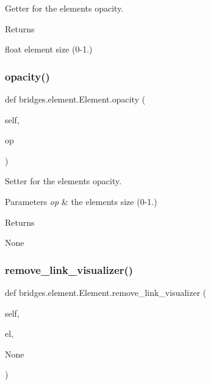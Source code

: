 Getter for the element\textquotesingle{}s opacity. 

\begin{DoxyReturn}{Returns}


float element size (0-\/1.) 
\end{DoxyReturn}
\mbox{\label{classbridges_1_1element_1_1_element_a1542425770b360b39369e3db7116d6ae}} 
\subsubsection{\texorpdfstring{opacity()}{opacity()}\hspace{0.1cm}{\footnotesize\ttfamily [2/2]}}
{\footnotesize\ttfamily def bridges.\+element.\+Element.\+opacity (\begin{DoxyParamCaption}\item[{}]{self,  }\item[{}]{op }\end{DoxyParamCaption})}



Setter for the element\textquotesingle{}s opacity. 


\begin{DoxyParams}{Parameters}
{\em op} & the element\textquotesingle{}s size (0-\/1.) \\
\hline
\end{DoxyParams}
\begin{DoxyReturn}{Returns}


None 
\end{DoxyReturn}
\mbox{\label{classbridges_1_1element_1_1_element_ad2aff75ace2a306deff639b4aa129ce0}} 
\subsubsection{\texorpdfstring{remove\+\_\+link\+\_\+visualizer()}{remove\_link\_visualizer()}}
{\footnotesize\ttfamily def bridges.\+element.\+Element.\+remove\+\_\+link\+\_\+visualizer (\begin{DoxyParamCaption}\item[{}]{self,  }\item[{}]{el,  }\item[{}]{None }\end{DoxyParamCaption})}



